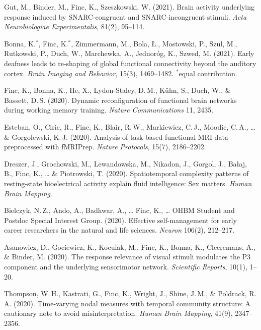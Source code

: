 \documentclass[10pt, a4paper]{article}
\newenvironment{cvlist}{%
  \begin{enumerate}[leftmargin=2em, label={[\arabic*]}, itemsep=0.25em, parsep=0pt]%
}{%
  \end{enumerate}%
}
\begin{document}
\begin{cvlist}
\item Gut, M., Binder, M., Finc, K., Szeszkowski, W. (2021). Brain activity underlying response induced by SNARC-congruent and SNARC-incongruent stimuli. \textit{Acta Neurobiologiae Experimentalis}, 81(2), 95--114.

\item Bonna, K.$^*$, Finc, K.$^*$, Zimmermann, M., Bola, {\L}., Mostowski, P., Szul, M., Rutkowski, P., Duch, W., Marchewka, A., Jednoróg, K., Szwed, M. (2021). Early deafness leads to re-shaping of global functional connectivity beyond the auditory cortex. \textit{Brain Imaging and Behavior}, 15(3), 1469--1482. $^*$equal contribution.

\item Finc, K., Bonna, K., He, X., Lydon-Staley, D.\,M., K\"uhn, S., Duch, W., \& Bassett, D.\,S. (2020). Dynamic reconfiguration of functional brain networks during working memory training. \textit{Nature Communications} 11, 2435.

\item Esteban, O., Ciric, R., Finc, K., Blair, R.\,W., Markiewicz, C.\,J., Moodie, C.\,A., \ldots{} \& Gorgolewski, K.\,J. (2020). Analysis of task-based functional MRI data preprocessed with fMRIPrep. \textit{Nature Protocols}, 15(7), 2186--2202.

\item Dreszer, J., Grochowski, M., Lewandowska, M., Nikadon, J., Gorgol, J., Ba{\l}aj, B., Finc, K., \ldots{} \& Piotrowski, T. (2020). Spatiotemporal complexity patterns of resting-state bioelectrical activity explain fluid intelligence: Sex matters. \textit{Human Brain Mapping}.

\item Bielczyk, N.\,Z., Ando, A., Badhwar, A., \ldots{} Finc, K., \ldots{} OHBM Student and Postdoc Special Interest Group. (2020). Effective self-management for early career researchers in the natural and life sciences. \textit{Neuron} 106(2), 212--217.

\item Asanowicz, D., Gociewicz, K., Koculak, M., Finc, K., Bonna, K., Cleeremans, A., \& Binder, M. (2020). The response relevance of visual stimuli modulates the P3 component and the underlying sensorimotor network. \textit{Scientific Reports}, 10(1), 1--20.

\item Thompson, W.\,H., Kastrati, G., Finc, K., Wright, J., Shine, J.\,M., \& Poldrack, R.\,A. (2020). Time-varying nodal measures with temporal community structure: A cautionary note to avoid misinterpretation. \textit{Human Brain Mapping}, 41(9), 2347--2356.


\end{cvlist}
\end{document}
